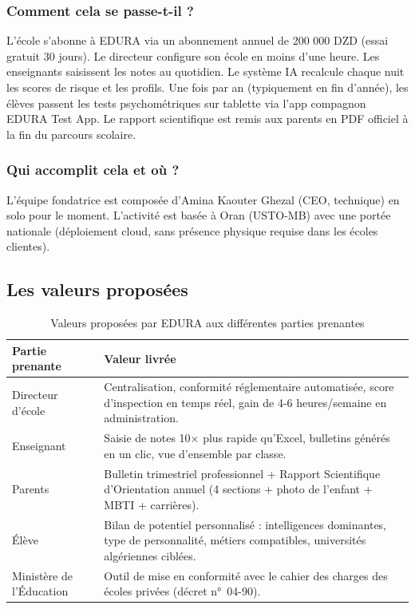 \documentclass[12pt,a4paper,oneside]{report}
\begin{document}
\subsubsection{Comment cela se passe-t-il ?}

L'école s'abonne à EDURA via un abonnement annuel de 200 000 DZD (essai gratuit 30 jours). Le directeur configure son école en moins d'une heure. Les enseignants saisissent les notes au quotidien. Le système IA recalcule chaque nuit les scores de risque et les profils. Une fois par an (typiquement en fin d'année), les élèves passent les tests psychométriques sur tablette via l'app compagnon EDURA Test App. Le rapport scientifique est remis aux parents en PDF officiel à la fin du parcours scolaire.

\subsubsection{Qui accomplit cela et où ?}

L'équipe fondatrice est composée d'Amina Kaouter Ghezal (CEO, technique) en solo pour le moment. L'activité est basée à Oran (USTO-MB) avec une portée nationale (déploiement cloud, sans présence physique requise dans les écoles clientes).

\subsection{Les valeurs proposées}

\begin{table}[H]
\centering
\caption{Valeurs proposées par EDURA aux différentes parties prenantes}
\label{tab:valeurs}
\begin{tabularx}{\textwidth}{lX}
\toprule
\textbf{Partie prenante} & \textbf{Valeur livrée} \\
\midrule
Directeur d'école & Centralisation, conformité réglementaire automatisée, score d'inspection en temps réel, gain de 4-6 heures/semaine en administration. \\
Enseignant & Saisie de notes 10× plus rapide qu'Excel, bulletins générés en un clic, vue d'ensemble par classe. \\
Parents & Bulletin trimestriel professionnel + Rapport Scientifique d'Orientation annuel (4 sections + photo de l'enfant + MBTI + carrières). \\
Élève & Bilan de potentiel personnalisé : intelligences dominantes, type de personnalité, métiers compatibles, universités algériennes ciblées. \\
Ministère de l'Éducation & Outil de mise en conformité avec le cahier des charges des écoles privées (décret n°~04-90). \\
\bottomrule
\end{tabularx}
\end{table}
\end{document}
